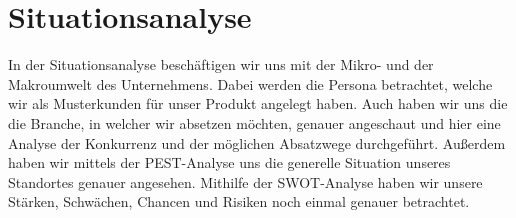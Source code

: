 \section{Situationsanalyse}
    In der Situationsanalyse beschäftigen wir uns mit der Mikro- und der Makroumwelt des Unternehmens. Dabei werden die 
    Persona betrachtet, welche wir als Musterkunden für unser Produkt angelegt haben. Auch haben wir uns die die 
    Branche, in welcher wir absetzen möchten, genauer angeschaut und hier eine Analyse der Konkurrenz und der möglichen 
    Absatzwege durchgeführt. Außerdem haben wir mittels der PEST-Analyse uns die generelle Situation unseres Standortes
    genauer angesehen. Mithilfe der SWOT-Analyse haben wir unsere Stärken, Schwächen, Chancen und Risiken noch einmal
    genauer betrachtet.